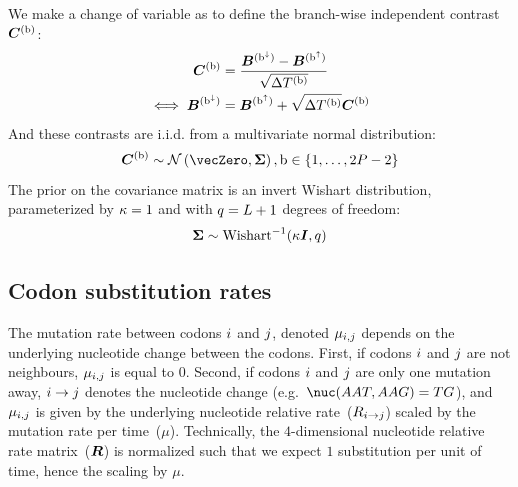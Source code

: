 \documentclass{MBE}
\begin{document}
	We make a change of variable as to define the branch-wise independent contrast $\bm{C}^{(\text{b})}$:
	\begin{align}
		\contrast\branchexp &= \dfrac{\Brownian^{(\nodeDown)} - \Brownian^{(\nodeUp)}}{\sqrt{\branchtime\branchexp}} \\
		\label{eq:independent_contrast}
		\iff \Brownian^{(\nodeDown)} &= \Brownian^{(\nodeUp)} + \sqrt{\branchtime\branchexp}\contrast\branchexp
	\end{align}
	And these contrasts are i.i.d.
	from a multivariate normal distribution:
	\begin{equation}
		\label{eq:Distribcontrast}
		\contrast\branchexp \sim \mathcal{N}\left(\vecZero, \CovarianceMatrix \right), \Setbranch
	\end{equation}
	The {prior} on the covariance matrix is an invert Wishart distribution, parameterized by $\kappa=1$ and with $q=L + 1$ degrees of freedom:
	\begin{equation}
		\label{eq:Distribcovariance}
		\CovarianceMatrix \sim \text{Wishart}^{-1} (\covariancekappa \Identitymatrix, \covariancedf)
	\end{equation}

	\subsection{Codon substitution rates}

	The mutation rate between codons ${i}$ and ${j}$, denoted $\mu_{{i}, {j}}$ depends on the underlying nucleotide change between the codons.
	First, if codons ${i}$ and ${j}$ are not neighbours, $\mu_{{i}, {j}}$ is equal to $0$.
	Second, if codons ${i}$ and ${j}$ are only one mutation away, ${i} \rightarrow {j}$ denotes the nucleotide change (e.g.~$\nuc(AAT, AAG) = TG$), and $\mu_{{i}, {j}}$ is given by the underlying nucleotide relative rate~(${R_{{i} \rightarrow {j}}}$) scaled by the mutation rate per time~($\mu$).
	Technically, the $4$-dimensional nucleotide relative rate matrix~($\bm{R}$) is normalized such that we expect $1$ {substitution} per unit of time, hence the scaling by $\mu$.
\end{document}
